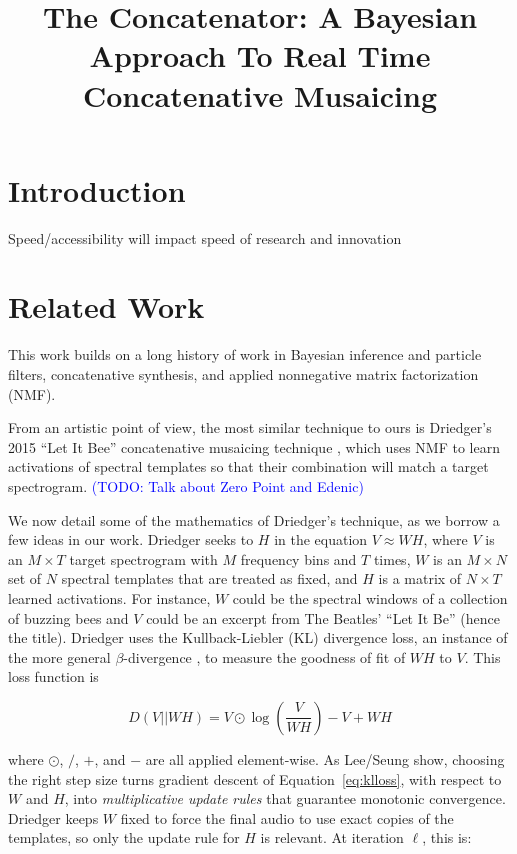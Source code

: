 \documentclass{article}
\title{The Concatenator: A Bayesian Approach To Real Time Concatenative Musaicing}
\newcommand{\BenEdit}[1]{\textcolor{blue}{(#1)}}
\begin{document}
%
\maketitle
%

\begin{abstract}

\end{abstract}

\section{Introduction}

Speed/accessibility will impact speed of research and innovation

\section{Related Work}
This work builds on a long history of work in Bayesian inference and particle filters, concatenative synthesis, and applied nonnegative matrix factorization (NMF).

From an artistic point of view, the most similar technique to ours is Driedger's 2015 ``Let It Bee'' concatenative musaicing technique \cite{driedger2015let}, which uses NMF to learn activations of spectral templates so that their combination will match a target spectrogram.
\BenEdit{TODO: Talk about Zero Point and Edenic}


We now detail some of the mathematics of Driedger's technique, as we borrow a few ideas in our work.  Driedger seeks to $H$ in the equation $V \approx WH$, where $V$ is an $M \times T$ target spectrogram with $M$ frequency bins and $T$ times, $W$ is an $M \times N$ set of $N$ spectral templates that are treated as fixed, and $H$ is a matrix of $N \times T$ learned activations.  For instance, $W$ could be the spectral windows of a collection of buzzing bees and $V$ could be an excerpt from The Beatles' ``Let It Be'' (hence the title).  Driedger uses the Kullback-Liebler (KL) divergence loss, an instance of the more general $\beta$-divergence \cite{buch2017nichtnegativematrixfaktorisierungnutzendesklangsynthesensystem}, to measure the goodness of fit of $WH$ to $V$.  This loss function is 

\begin{equation}
\label{eq:klloss}
D(V || WH) = V \odot \log \left( \frac{V}{WH} \right) - V + WH
\end{equation}

where $\odot$, $/$, $+$, and $-$ are all applied element-wise.  As Lee/Seung show, choosing the right step size turns gradient descent of Equation~\ref{eq:klloss}, with respect to $W$ and $H$, into {\em multiplicative update rules} that guarantee monotonic convergence.  Driedger keeps $W$ fixed to force the final audio to use exact copies of the templates, so only the update rule for $H$ is relevant.  At iteration $\ell$, this is:
\end{document}
